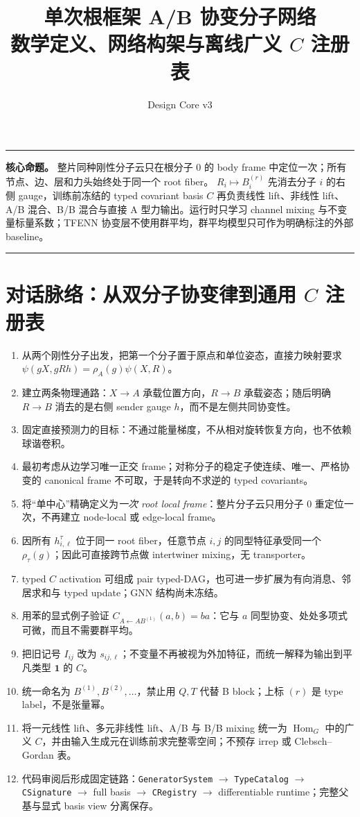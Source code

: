 \documentclass[11pt,a4paper,fontset=fandol]{ctexart}
\title{\vspace{-1.5em}\textcolor{Ink}{\bfseries 单次根框架 A/B 协变分子网络}\\[.35em]
\large\textcolor{Muted}{数学定义、网络构架与离线广义 $C$ 注册表}}
\author{}
\date{Design Core v3}
\newcommand{\Hom}{\operatorname{Hom}}
\newcommand{\one}{\mathbf 1}
\newenvironment{designbox}
{\par\smallskip\noindent\begin{center}\begin{minipage}{0.94\linewidth}
 \color{Ink}\hrule\vspace{.55em}\color{black}}
{\vspace{.45em}\color{Ink}\hrule\end{minipage}\end{center}\smallskip}
\begin{document}
\maketitle
\vspace{-2.2em}

\begin{designbox}
\textbf{核心命题。}
整片同种刚性分子云只在根分子 $0$ 的 body frame 中定位一次；所有节点、边、层和力头始终处于同一个 root fiber。
$R_i\mapsto B_i^{(r)}$ 先消去分子 $i$ 的右侧 gauge，训练前冻结的 typed covariant basis $C$ 再负责线性 lift、非线性 lift、A/B 混合、B/B 混合与直接 A 型力输出。运行时只学习 channel mixing 与不变量标量系数；TFENN 协变层不使用群平均，群平均模型只可作为明确标注的外部 baseline。
\end{designbox}

\section{对话脉络：从双分子协变律到通用 $C$ 注册表}

\begin{enumerate}
  \item 从两个刚性分子出发，把第一个分子置于原点和单位姿态，直接力映射要求
  $\psi(gX,gRh)=\rho_A(g)\psi(X,R)$。
  \item 建立两条物理通路：$X\to A$ 承载位置方向，$R\to B$ 承载姿态；随后明确 $R\to B$ 消去的是右侧 sender gauge $h$，而不是左侧共同协变性。
  \item 固定直接预测力的目标：不通过能量梯度，不从相对旋转恢复方向，也不依赖球谐卷积。
  \item 最初考虑从边学习唯一正交 frame；对称分子的稳定子使连续、唯一、严格协变的 canonical frame 不可取，于是转向不求逆的 typed covariants。
  \item 将“单中心”精确定义为\emph{一次 root local frame}：整片分子云只用分子 $0$ 重定位一次，不再建立 node-local 或 edge-local frame。
  \item 因所有 $h_{i,\ell}^{\tau}$ 位于同一 root fiber，任意节点 $i,j$ 的同型特征承受同一个 $\rho_\tau(g)$；因此可直接跨节点做 intertwiner mixing，无 transporter。
  \item typed $C$ activation 可组成 pair typed-DAG，也可进一步扩展为有向消息、邻居求和与 typed update；GNN 结构尚未冻结。
  \item 用苯的显式例子验证 $C_{A\leftarrow AB^{(1)}}(a,b)=ba$：它与 $a$ 同型协变、处处多项式可微，而且不需要群平均。
  \item 把旧记号 $I_{ij}$ 改为 $s_{ij,\ell}$；不变量不再被视为外加特征，而统一解释为输出到平凡类型 $\one$ 的 $C$。
  \item 统一命名为 $B^{(1)},B^{(2)},\ldots$，禁止用 $Q,T$ 代替 B block；上标 $(r)$ 是 type label，不是张量幂。
  \item 将一元线性 lift、多元非线性 lift、A/B 与 B/B mixing 统一为 $\Hom_G$ 中的广义 $C$，并由输入生成元在训练前求完整零空间；不预存 irrep 或 Clebsch--Gordan 表。
  \item 代码审阅后形成固定链路：\texttt{GeneratorSystem} $\to$ \texttt{TypeCatalog} $\to$ \texttt{CSignature} $\to$ full basis $\to$ \texttt{CRegistry} $\to$ differentiable runtime；完整父基与显式 basis view 分离保存。
\end{enumerate}
\end{document}
